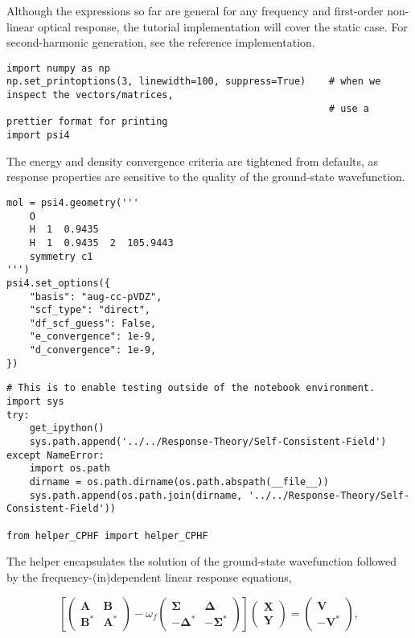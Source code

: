 \documentclass[]{article}
\begin{document}
Although the expressions so far are general for any frequency and
first-order non-linear optical response, the tutorial implementation
will cover the static case. For second-harmonic generation, see the
reference implementation.

\begin{verbatim}
import numpy as np
np.set_printoptions(3, linewidth=100, suppress=True)    # when we inspect the vectors/matrices,
                                                        # use a prettier format for printing
import psi4
\end{verbatim}

The energy and density convergence criteria are tightened from defaults,
as response properties are sensitive to the quality of the ground-state
wavefunction.

\begin{verbatim}
mol = psi4.geometry('''
    O
    H  1  0.9435
    H  1  0.9435  2  105.9443
    symmetry c1
''')
psi4.set_options({
    "basis": "aug-cc-pVDZ",
    "scf_type": "direct",
    "df_scf_guess": False,
    "e_convergence": 1e-9,
    "d_convergence": 1e-9,
})
\end{verbatim}

\begin{verbatim}
# This is to enable testing outside of the notebook environment.
import sys
try:
    get_ipython()
    sys.path.append('../../Response-Theory/Self-Consistent-Field')
except NameError:
    import os.path
    dirname = os.path.dirname(os.path.abspath(__file__))
    sys.path.append(os.path.join(dirname, '../../Response-Theory/Self-Consistent-Field'))

from helper_CPHF import helper_CPHF
\end{verbatim}

The helper encapsulates the solution of the ground-state wavefunction
followed by the frequency-(in)dependent linear response equations,

\[
\left[
\begin{pmatrix}
\mathbf{A} & \mathbf{B} \\ 
\mathbf{B}^{*} & \mathbf{A}^{*}
\end{pmatrix}
- \omega_{f}
\begin{pmatrix}
\mathbf{\Sigma} & \mathbf{\Delta} \\ 
-\mathbf{\Delta}^{*} & -\mathbf{\Sigma}^{*}
\end{pmatrix}
\right]
\begin{pmatrix}
\mathbf{X} \\ 
\mathbf{Y}
\end{pmatrix}
=
\begin{pmatrix}
\mathbf{V} \\ 
-\mathbf{V}^{*}
\end{pmatrix}
,
\]
\end{document}
